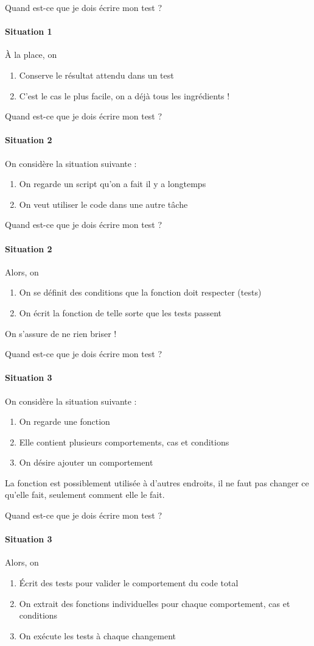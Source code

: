 \documentclass[11pt]{beamer}
\begin{document}
\begin{frame}{Quand est-ce que je dois écrire mon test ?}
\framesubtitle{Situation 1}
À la place, on
\begin{enumerate}
\item Conserve le résultat attendu dans un test
\item C'est le cas le plus facile, on a déjà tous les ingrédients !
\end{enumerate}
\end{frame}

\begin{frame}{Quand est-ce que je dois écrire mon test ?}
\framesubtitle{Situation 2}
On considère la situation suivante :
\begin{enumerate}
\item On regarde un script qu'on a fait il y a longtemps
\item On veut utiliser le code dans une autre tâche
\end{enumerate}
\end{frame}

\begin{frame}{Quand est-ce que je dois écrire mon test ?}
\framesubtitle{Situation 2}
Alors, on
\begin{enumerate}
\item On se définit des conditions que la fonction doit respecter (tests)
\item On écrit la fonction de telle sorte que les tests passent
\end{enumerate}
On s'assure de ne rien briser !
\end{frame}

\begin{frame}{Quand est-ce que je dois écrire mon test ?}
\framesubtitle{Situation 3}
On considère la situation suivante :
\begin{enumerate}
\item On regarde une fonction
\item Elle contient plusieurs comportements, cas et conditions
\item On désire ajouter un comportement
\end{enumerate}
La fonction est possiblement utilisée à d'autres endroits, il ne faut pas changer ce qu'elle fait, seulement comment elle le fait.
\end{frame}

\begin{frame}{Quand est-ce que je dois écrire mon test ?}
\framesubtitle{Situation 3}
Alors, on
\begin{enumerate}
\item Écrit des tests pour valider le comportement du code total
\item On extrait des fonctions individuelles pour chaque comportement, cas et conditions
\item On exécute les tests à chaque changement
\end{enumerate}
\end{frame}
\end{document}
